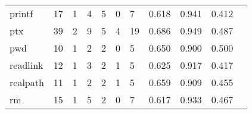 \begin{longtable}{lp{1.2cm}p{1.2cm}p{1.2cm}p{1.2cm}p{1.2cm}p{1.2cm}p{1.2cm}p{1.2cm}p{1.2cm}p{1.2cm}}
printf    &                                    17 &                                                  1 &                                                  4 &                                                  5 &                                                  0 &                                                  7 &                                              0.618 &                                              0.941 &                                              0.412 \\
ptx       &                                    39 &                                                  2 &                                                  9 &                                                  5 &                                                  4 &                                                 19 &                                              0.686 &                                              0.949 &                                              0.487 \\
pwd       &                                    10 &                                                  1 &                                                  2 &                                                  2 &                                                  0 &                                                  5 &                                              0.650 &                                              0.900 &                                              0.500 \\
readlink  &                                    12 &                                                  1 &                                                  3 &                                                  2 &                                                  1 &                                                  5 &                                              0.625 &                                              0.917 &                                              0.417 \\
realpath  &                                    11 &                                                  1 &                                                  2 &                                                  2 &                                                  1 &                                                  5 &                                              0.659 &                                              0.909 &                                              0.455 \\
rm        &                                    15 &                                                  1 &                                                  5 &                                                  2 &                                                  0 &                                                  7 &                                              0.617 &                                              0.933 &                                              0.467 \\

\end{longtable}
